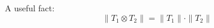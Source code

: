 \documentclass{article}
\theoremstyle{definition}
\theoremstyle{plain}
\begin{document}
A useful fact:
\begin{equation}
    \|T_1 \otimes T_2\| = \|T_1\|\cdot\|T_2\|
\end{equation}

\pagebreak



\end{document}
